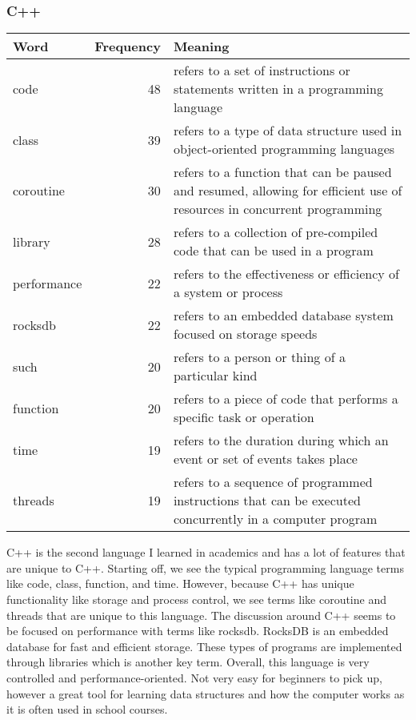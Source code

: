 \documentclass{article}
\theoremstyle{theorem}
\theoremstyle{definition}
\theoremstyle{remark}
\begin{document}
\subsubsection{C++}
\begin{tabular}{ | l | r | p{7cm} | }
\hline
Word & Frequency & Meaning \\
\hline
code & 48 & refers to a set of instructions or statements written in a programming language \\
\hline
class & 39 & refers to a type of data structure used in object-oriented programming languages \\
\hline
coroutine & 30 & refers to a function that can be paused and resumed, allowing for efficient use of resources in concurrent programming \\
\hline
library & 28 & refers to a collection of pre-compiled code that can be used in a program \\
\hline
performance & 22 & refers to the effectiveness or efficiency of a system or process \\
\hline
rocksdb & 22 & refers to an embedded database system focused on storage speeds \\
\hline
such & 20 & refers to a person or thing of a particular kind \\
\hline
function & 20 & refers to a piece of code that performs a specific task or operation \\
\hline
time & 19 & refers to the duration during which an event or set of events takes place \\
\hline
threads & 19 & refers to a sequence of programmed instructions that can be executed concurrently in a computer program \\
\hline
\end{tabular}

\medskip
C++ is the second language I learned in academics and has a lot of features that are unique to C++. Starting off, we see the typical programming language terms like code, class, function, and time. However, because C++ has unique functionality like storage and process control, we see terms like coroutine and threads that are unique to this language. The discussion around C++ seems to be focused on performance with terms like rocksdb. RocksDB is an embedded database for fast and efficient storage. These types of programs are implemented through libraries which is another key term. Overall, this language is very controlled and performance-oriented. Not very easy for beginners to pick up, however a great tool for learning data structures and how the computer works as it is often used in school courses.
\end{document}
